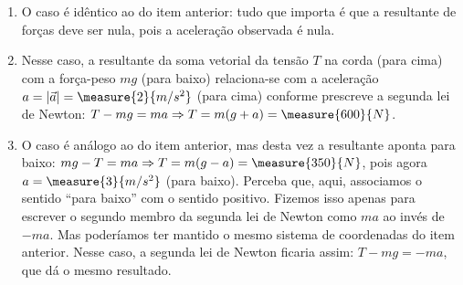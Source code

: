 \begin{question}
\begin{solution}
\begin{enumerate}
        \item O caso é idêntico ao do item anterior: tudo que importa é que a resultante de forças deve ser nula, pois a aceleração observada é nula.

        \item Nesse caso, a resultante da soma vetorial da tensão $T$ na corda (para cima) com a força-peso $mg$ (para baixo) relaciona-se com a aceleração $a = |\vec a| = \measure{2}{m/s^2}$ (para cima) conforme prescreve a segunda lei de Newton: $T - mg = ma \Rightarrow T = m(g + a) = \measure{600}{N}$.

        \item O caso é análogo ao do item anterior, mas desta vez a resultante aponta para baixo: $mg - T = ma \Rightarrow T = m(g - a) = \measure{350}{N}$, pois agora $a = \measure{3}{m/s^2}$ (para baixo).
        Perceba que, aqui, associamos o sentido ``para baixo'' com o sentido positivo.
        Fizemos isso apenas para escrever o segundo membro da segunda lei de Newton como $ma$ ao invés de $-ma$.
        Mas poderíamos ter mantido o mesmo sistema de coordenadas do item anterior.
        Nesse caso, a segunda lei de Newton ficaria assim: $T - mg = -ma$, que dá o mesmo resultado.
      \end{enumerate}
    \end{solution}
  \end{question}